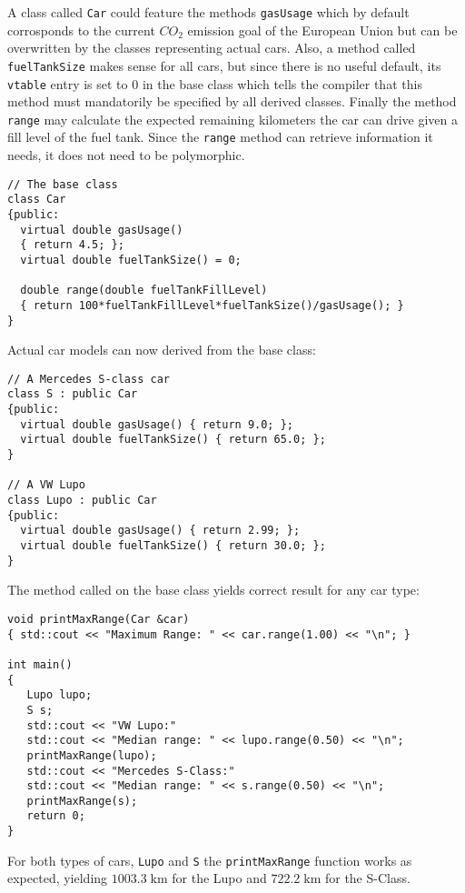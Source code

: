 \begin{example}
  \label{example:DynPoly}
  A class called \texttt{Car} could feature the methods
  \texttt{gasUsage} which by default corrosponds to the current $CO_2$
  emission goal of the European Union but can be overwritten by the
  classes representing actual cars. Also, a method called
  \texttt{fuelTankSize} makes sense for all cars, but since there is
  no useful default, its \texttt{vtable} entry is set to $0$ in the
  base class which tells the compiler that this method must
  mandatorily be specified by all derived classes. Finally the method
  \texttt{range} may calculate the expected remaining kilometers the
  car can drive given a fill level of the fuel tank. Since the
  \texttt{range} method can retrieve information it needs, it does not
  need to be polymorphic.
\begin{verbatim}
// The base class
class Car
{public:
  virtual double gasUsage() 
  { return 4.5; };
  virtual double fuelTankSize() = 0;
  
  double range(double fuelTankFillLevel) 
  { return 100*fuelTankFillLevel*fuelTankSize()/gasUsage(); }
}
\end{verbatim}

  Actual car models can now derived from the base class:
\begin{verbatim}
// A Mercedes S-class car
class S : public Car
{public:
  virtual double gasUsage() { return 9.0; };
  virtual double fuelTankSize() { return 65.0; };
}

// A VW Lupo
class Lupo : public Car
{public:
  virtual double gasUsage() { return 2.99; };
  virtual double fuelTankSize() { return 30.0; };
}
\end{verbatim}

The  method called on the base class yields correct result
for any car type:
\begin{verbatim}
void printMaxRange(Car &car)
{ std::cout << "Maximum Range: " << car.range(1.00) << "\n"; }

int main()
{
   Lupo lupo;
   S s;
   std::cout << "VW Lupo:"
   std::cout << "Median range: " << lupo.range(0.50) << "\n";
   printMaxRange(lupo);
   std::cout << "Mercedes S-Class:"
   std::cout << "Median range: " << s.range(0.50) << "\n";
   printMaxRange(s);
   return 0;
}
\end{verbatim}

For both types of cars, \texttt{Lupo} and \texttt{S} the
\texttt{printMaxRange} function works as expected, yielding
$1003.3\;\mathrm{km}$ for the Lupo and $722.2\;\mathrm{km}$ for the
S-Class.
\end{example}

